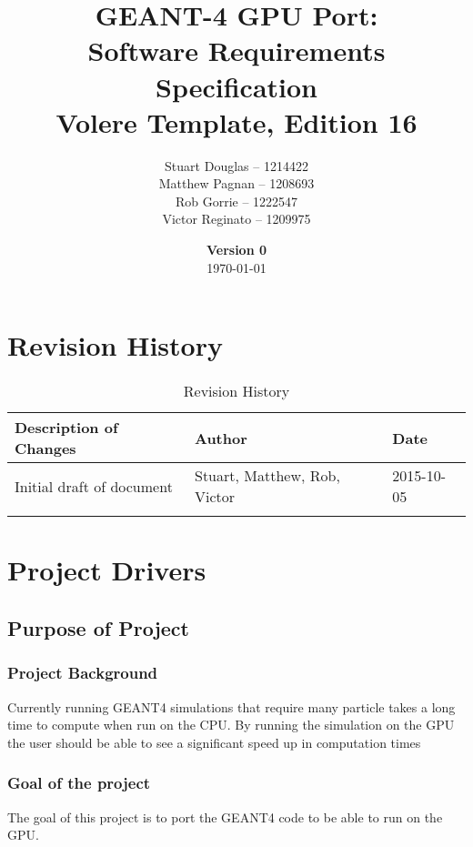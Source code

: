 \documentclass[12pt]{article}
\title{
\LARGE GEANT-4 GPU Port:
\\\vspace{10mm}
\large \textbf{Software Requirements Specification}
\\Volere Template, Edition 16
\vspace{40mm}
}
\author{
Stuart Douglas -- 1214422
\\Matthew Pagnan -- 1208693
\\Rob Gorrie -- 1222547
\\Victor Reginato -- 1209975
\vspace{10mm}
}
\date{\vfill \textbf{Version 0}\\ \today}
\begin{document}

\maketitle
\newpage

\tableofcontents
\newpage
{}

\section{Revision History}
\begin{table}[h]
\centering
\caption{Revision History}
\begin{tabular}{l|l|l}
\Xhline{2\arrayrulewidth}
\bf Description of Changes & \bf Author & \bf Date\\\hline
Initial draft of document & Stuart, Matthew, Rob, Victor & 2015-10-05\\
\Xhline{2\arrayrulewidth}
\end{tabular}
\end{table}

\section{Project Drivers}

\subsection{Purpose of Project} %
\subsubsection{Project Background}
Currently running GEANT4 simulations that require many particle takes a long time to compute when run on the CPU. By running the simulation on the GPU the user should be able to see a significant speed up in computation times

\subsubsection{Goal of the project}
The goal of this project is to port the GEANT4 code to be able to run on the GPU.
\end{document}
